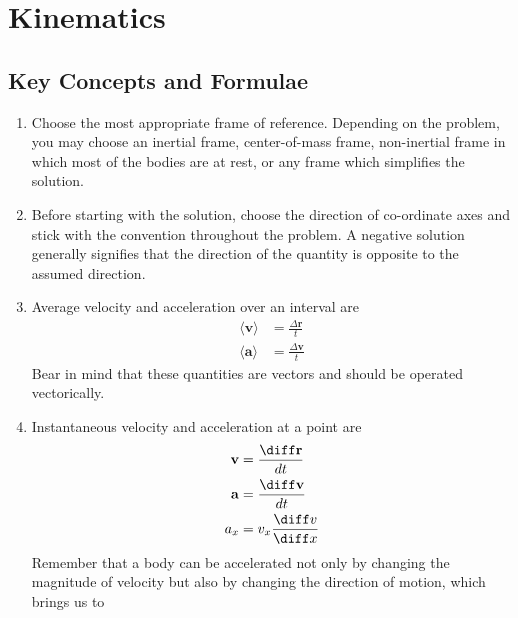 \chapter{Kinematics}

\pagestyle{fancy}
\fancyhf{}
\fancyhead[OC]{\leftmark}
\fancyhead[EC]{\rightmark}
\cfoot{\thepage}

\section{Key Concepts and Formulae}

\begin{enumerate}
\item Choose the most appropriate frame of reference. Depending on the problem, you may choose an inertial frame, center-of-mass frame, non-inertial frame in which most of the bodies are at rest, or any frame which simplifies the solution.

\item Before starting with the solution, choose the direction of co-ordinate axes and stick with the convention throughout the problem. A negative solution generally signifies that the direction of the quantity is opposite to the assumed direction.

\item Average velocity and acceleration over an interval are 
\begin{align}
\langle\mathbf{v}\rangle &= \frac{\Delta\mathbf{r}}{t} \label{eq1}\\
\langle\mathbf{a}\rangle &= \frac{\Delta\mathbf{v}}{t} \label{eq2}
\end{align}
Bear in mind that these quantities are vectors and should be operated vectorically.

\item Instantaneous velocity and acceleration at a point are
\begin{align}
\mathbf{v} &= \frac{\diff \mathbf{r}}{dt} \label{eq3}\\
\mathbf{a} &= \frac{\diff \mathbf{v}}{dt} \label{eq4}\\
a_x &= v_x\frac{\diff v}{\diff x} \label{eq5}
\end{align}
Remember that a body can be accelerated not only by changing the magnitude of velocity but also by changing the direction of motion, which brings us to


\end{enumerate}
